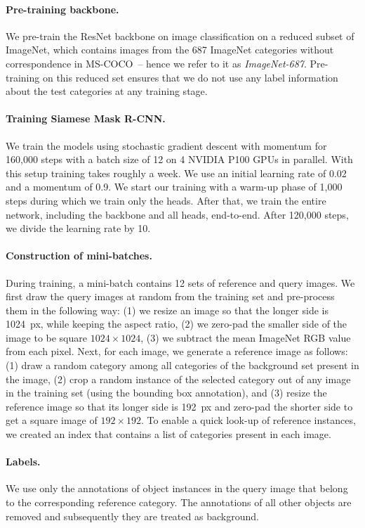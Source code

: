 \documentclass{article}
\newcommand{\coco}{MS-COCO\xspace}
\begin{document}
\paragraph{Pre-training backbone.}
We pre-train the ResNet backbone on image classification on a reduced subset of ImageNet, which contains images from the 687 ImageNet categories without correspondence in \coco~-- hence we refer to it as \emph{ImageNet-687}. Pre-training on this reduced set ensures that we do not use any label information about the test categories at any training stage.


\paragraph{Training Siamese Mask R-CNN.}
We train the models using stochastic gradient descent with momentum for 160,000 steps with a batch size of 12 on 4 NVIDIA P100 GPUs in parallel. With this setup training takes roughly a week. We use an initial learning rate of 0.02 and a momentum of 0.9. We start our training with a warm-up phase of 1,000 steps during which we train only the heads. After that, we train the entire network, including the backbone and all heads, end-to-end. After 120,000 steps, we divide the learning rate by 10.


\paragraph{Construction of mini-batches.}
During training, a mini-batch contains 12 sets of reference and query images. We first draw the query images at random from the training set and pre-process them in the following way: (1) we resize an image so that the longer side is 1024~px, while keeping the aspect ratio, (2) we zero-pad the smaller side of the image to be square $1024 \times 1024$, (3) we subtract the mean ImageNet RGB value from each pixel. Next, for each image, we generate a reference image as follows: (1) draw a random category among all categories of the background set present in the image, (2) crop a random instance of the selected category out of any image in the training set (using the bounding box annotation), and (3) resize the reference image so that its longer side is 192~px and zero-pad the shorter side to get a square image of $192 \times 192$. To enable a quick look-up of reference instances, we created an index that contains a list of categories present in each image.


\paragraph{Labels.}
We use only the annotations of object instances in the query image that belong to the corresponding reference category. The annotations of all other objects are removed and subsequently they are treated as background.
\end{document}
